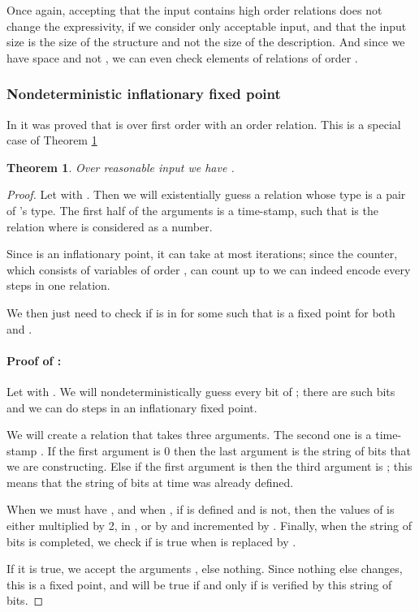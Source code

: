 \documentclass[a4paper,12pt]{article}
\newcommand{\sss}[1]{\subsubsection{#1}}
\newtheorem{theorem}{Theorem}[section]
\theoremstyle{definition}
\begin{document}
Once again, accepting that the input contains high order relations does
not change the expressivity, if we consider only acceptable input, and that the
input size is the size of the structure and not the size of the
description. And since we have space  and
not , we can even check elements of relations
of order .

\sss{Nondeterministic inflationary fixed point}
In \cite{nfp} it was proved that {} is \NP{} over first
order with an order relation. This is a special case of Theorem
\ref{tnifp}

\begin{theorem}\label{tnifp}
  Over reasonable input we have .
\end{theorem}
  \begin{proof} Let  with . Then we
    will existentially guess a relation  whose type is a pair of
    's type. The first half of the arguments is a time-stamp,
    such that  is the relation  where 
    is considered as a number.

  Since  is an inflationary point, it can take at most
   iterations; since the counter, which consists of
  variables of order , can count up to  we can
  indeed encode every steps in one relation.

  We then just need to check if  is in  for
  some  such that  is a fixed point for both
   and .

\paragraph{Proof of :}
Let  with . We will
nondeterministically guess every bit of ; there are  such bits and we can do  steps in an
inflationary fixed point. 

We will create a relation  that takes three arguments. The second
one is a time-stamp . If the first argument is 0 then the
last argument is the string of bits that we are constructing. Else if
the first argument is  then the third argument is ; this means
that the string of bits at time  was already defined.

When  we must have , and when , if
 is defined and  is not, then the values of
 is either multiplied by 2, in , or by  and
incremented by . Finally, when the string of bits is completed,
we check if  is true when  is replaced by
.

If it is true, we accept the arguments , else nothing. Since
nothing else changes, this is a fixed point, and  will be true
if and only if  is verified by this string of bits.

\end{proof}
\end{document}
